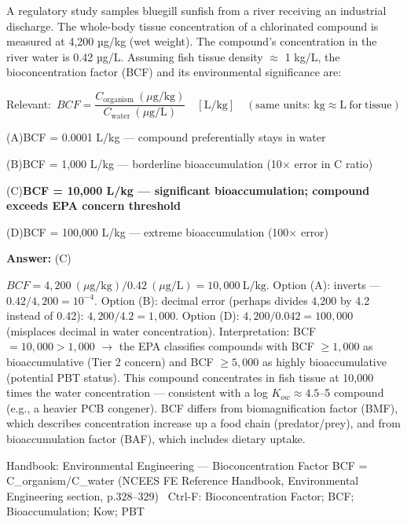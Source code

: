 \documentclass[11pt]{article}
\newcommand{\correct}[1]{\textbf{#1}\;{\color{accent}$\checkmark$}}
\newcommand{\optline}[2]{\par\noindent\hspace{1.2em}(#1)\hspace{0.6em}#2}
\begin{document}
A regulatory study samples bluegill sunfish from a river receiving an industrial discharge. The whole-body tissue concentration of a chlorinated compound is measured at 4,200 µg/kg (wet weight). The compound's concentration in the river water is 0.42 µg/L. Assuming fish tissue density $\approx$ 1 kg/L, the bioconcentration factor (BCF) and its environmental significance are:\par\vspace{3pt}
{\small\color{soft}Relevant:}\ $BCF = \dfrac{C_{\mathrm{organism}}\ (\mu\mathrm{g/kg})}{C_{\mathrm{water}}\ (\mu\mathrm{g/L})}\quad[\mathrm{L/kg}]\quad(\text{same units: kg}\approx\mathrm{L\ for\ tissue})$\par\vspace{3pt}
\optline{A}{BCF = 0.0001 L/kg --- compound preferentially stays in water}
\optline{B}{BCF = 1,000 L/kg --- borderline bioaccumulation (10$\times$ error in C ratio)}
\optline{C}{\correct{BCF = 10,000 L/kg --- significant bioaccumulation; compound exceeds EPA concern threshold}}
\optline{D}{BCF = 100,000 L/kg --- extreme bioaccumulation (100$\times$ error)}
\par\vspace{3pt}
\vspace{2pt}\par\noindent\colorbox{boxbg}{\parbox{\dimexpr\linewidth-2\fboxsep\relax}{%
\vspace{2pt}\textbf{Answer:} (C)\par\vspace{2pt}
{\small $BCF = 4{,}200\ (\mu\mathrm{g/kg}) / 0.42\ (\mu\mathrm{g/L}) = 10{,}000\ \mathrm{L/kg}$. Option (A): inverts --- $0.42/4{,}200 = 10^{-4}$. Option (B): decimal error (perhaps divides 4,200 by 4.2 instead of 0.42): $4{,}200/4.2 = 1{,}000$. Option (D): $4{,}200/0.042 = 100{,}000$ (misplaces decimal in water concentration). Interpretation: BCF $= 10{,}000 > 1{,}000$ $\rightarrow$ the EPA classifies compounds with BCF $\geq 1{,}000$ as bioaccumulative (Tier 2 concern) and BCF $\geq 5{,}000$ as highly bioaccumulative (potential PBT status). This compound concentrates in fish tissue at 10,000 times the water concentration --- consistent with a log $K_{ow}\approx 4.5$--5 compound (e.g., a heavier PCB congener). BCF differs from biomagnification factor (BMF), which describes concentration increase up a food chain (predator/prey), and from bioaccumulation factor (BAF), which includes dietary uptake.}\par\vspace{2pt}
{\footnotesize\color{soft}Handbook: Environmental Engineering --- Bioconcentration Factor BCF = C\_organism/C\_water (NCEES FE Reference Handbook, Environmental Engineering section, p.328--329) \textbullet\ Ctrl-F: Bioconcentration Factor; BCF; Bioaccumulation; Kow; PBT}\vspace{2pt}
}}
\vspace{9pt}
\end{document}
